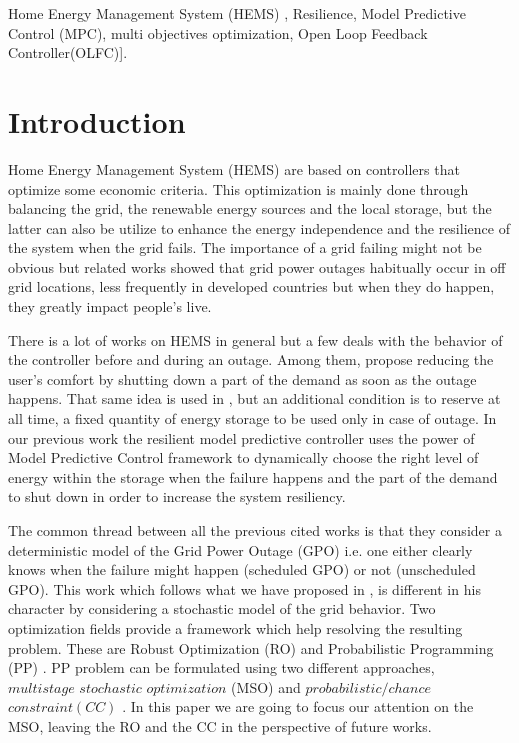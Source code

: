 \documentclass[conference]{IEEEtran}
\begin{document}
\begin{IEEEkeywords}
Home Energy Management System (HEMS) , Resilience, Model Predictive Control (MPC), multi objectives optimization, Open Loop Feedback Controller(OLFC)].
\end{IEEEkeywords}

\section{Introduction}
Home Energy Management System (HEMS) are based on controllers that optimize some economic criteria. This optimization is mainly done through balancing the grid, the renewable energy sources and the local storage, but the latter can also be utilize to enhance the energy independence and the resilience of the system when the grid fails. The importance of a grid failing might not be obvious but related works \cite{OnlnCER} showed that grid power outages habitually occur in off grid locations, less frequently in developed countries but when they do happen, they greatly impact people's live.

There is a lot of works on HEMS in general but a few deals with the behavior of the controller before and during an outage. Among them, \cite{HGhRBo2015,RRoFBe2014} propose reducing the user's comfort by shutting down a part of the demand as soon as the outage happens. That same idea is used in \cite{JMaHJa2016}, but an additional condition is to reserve at all time, a fixed quantity of energy storage to be used only in case of outage. In our previous work \cite{JPrPHa2019} the resilient model predictive controller uses the power of Model Predictive Control framework to dynamically choose the right level of energy within the storage when the failure happens and the part of the demand to shut down in order to increase the system resiliency.

The common thread between all the previous cited works is that they consider a deterministic model of the Grid Power Outage (GPO) i.e. one either clearly knows when the failure might happen (scheduled GPO) or not (unscheduled GPO). 
This work which follows what we have proposed in \cite{JPrPHa2019}, is different in his character by considering a stochastic model of the grid behavior. Two optimization fields  provide a framework which help resolving the resulting problem. These are Robust Optimization (RO) \cite{BenTal2009} and Probabilistic Programming (PP) \cite{Ankopa1995}. PP problem can be formulated using two different approaches, $multistage\,\, stochastic \,\, optimization$ (MSO) \cite{Ankopa1995} and  $probabilistic/chance$  $constraint (CC)$ \cite{AChWCo1958,AChWCo1959}. In this paper we are going to focus our attention on the MSO, leaving the RO and the CC in the  perspective  of  future  works.
\end{document}
